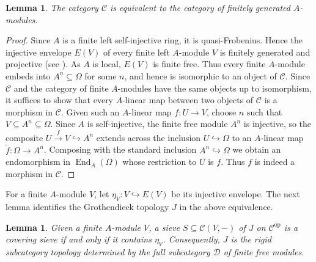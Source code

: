 \documentclass[10pt, reqno]{amsart}
\theoremstyle{plain}
\newtheorem{lemma}[theorem]{Lemma}
\numberwithin{equation}{section}
\theoremstyle{definition}
\newcommand{\End}{\operatorname{End}}
\newcommand{\op}{\mathrm{op}}
\newcommand{\C}{\mathscr C}
\newcommand{\D}{\mathscr D}
\begin{document}
\begin{lemma} \label{prop:C-all-modules}
The category $\C$ is equivalent to the category of finitely generated $A$-modules.
\end{lemma}

\begin{proof}
Since $A$ is a finite left self-injective ring, it is quasi-Frobenius. Hence the injective envelope $E(V)$ of every finite left $A$-module $V$ is finitely generated and projective (see \cite[\S 15]{Lam}). As $A$ is local, $E(V)$ is finite free. Thus every finite $A$-module embeds into $A^n \subseteq \Omega$ for some $n$, and hence is isomorphic to an object of $\C$. Since $\C$ and the category of finite $A$-modules have the same objects up to isomorphism, it suffices to show that every $A$-linear map between two objects of $\C$ is a morphism in $\C$. Given such an $A$-linear map $
f: U \to V$, choose $n$ such that $V \subseteq A^n \subseteq \Omega$. Since $A$ is self-injective, the finite free module $A^n$ is injective, so the composite $U \xrightarrow{\,f\,} V \hookrightarrow A^n$ extends across the inclusion $U \hookrightarrow \Omega$ to an $A$-linear map $\widetilde{f}: \Omega \to A^n$. Composing with the standard inclusion $A^n \hookrightarrow \Omega$ we obtain an endomorphism in $\End_A(\Omega)$ whose restriction to $U$ is $f$. Thus $f$ is indeed a morphism in $\C$.
\end{proof}

For a finite $A$-module $V$, let $\eta_V: V \hookrightarrow E(V)$ be its injective envelope. The next lemma identifies the Grothendieck topology $J$ in the above equivalence.

\begin{lemma}\label{thm:rigid-topology}
Given a finite $A$-module $V$, a sieve $S \subseteq \C(V, -)$ of $J$ on $\C^{\op}$ is a covering sieve if and only if it contains $\eta_V$. Consequently, $J$ is the rigid subcategory topology determined by the full subcategory $\D$ of finite free modules.
\end{lemma}
\end{document}

